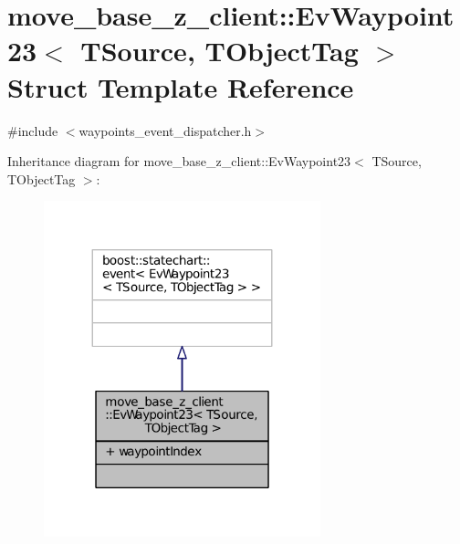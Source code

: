 \hypertarget{structmove__base__z__client_1_1EvWaypoint23}{}\section{move\+\_\+base\+\_\+z\+\_\+client\+:\+:Ev\+Waypoint23$<$ T\+Source, T\+Object\+Tag $>$ Struct Template Reference}
\label{structmove__base__z__client_1_1EvWaypoint23}


{\ttfamily \#include $<$waypoints\+\_\+event\+\_\+dispatcher.\+h$>$}



Inheritance diagram for move\+\_\+base\+\_\+z\+\_\+client\+:\+:Ev\+Waypoint23$<$ T\+Source, T\+Object\+Tag $>$\+:
\nopagebreak
\begin{figure}[H]
\begin{center}
\leavevmode
\includegraphics[width=227pt]{structmove__base__z__client_1_1EvWaypoint23__inherit__graph}
\end{center}
\end{figure}



